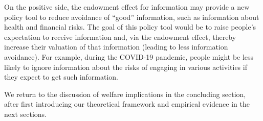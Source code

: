 
On the positive side, the endowment effect for information may provide a new policy tool to reduce avoidance of \enquote{good} information, such as information about health and financial risks. The goal of this policy tool would be to raise people's expectation to receive information and, via the endowment effect, thereby increase their valuation of that information (leading to less information avoidance). For example, during the COVID-19 pandemic, people might be less likely to ignore information about the risks of engaging in various activities if they expect to get such information.

We return to the discussion of welfare implications in the concluding section, after first introducing our theoretical framework and empirical evidence in the next sections.
